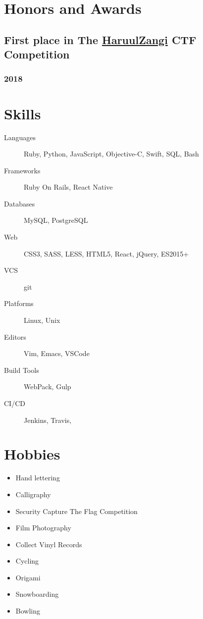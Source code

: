 \documentclass[letterpaper]{article}
\begin{document}
\section{Honors and Awards}
\label{sec:org1446ea2}
\subsection{First place in The \href{http:www.haruulzangi.mn}{HaruulZangi} CTF Competition}
\label{sec:org748aa3c}
\subsubsection{2018}
\label{sec:org92c4b37}
\section{Skills}
\label{sec:org0ad59ad}
\begin{description}
\item[{Languages}] Ruby, Python, JavaScript, Objective-C, Swift, SQL, Bash
\item[{Frameworks}] Ruby On Rails, React Native
\item[{Databases}] MySQL, PostgreSQL
\item[{Web}] CSS3, SASS, LESS, HTML5, React, jQuery, ES2015+
\item[{VCS}] git
\item[{Platforms}] Linux, Unix
\item[{Editors}] Vim, Emacs, VSCode
\item[{Build Tools}] WebPack, Gulp
\item[{CI/CD}] Jenkins, Travis,
\end{description}
\section{Hobbies}
\label{sec:org8107682}
\begin{itemize}
\item Hand lettering
\item Calligraphy
\item Security Capture The Flag Competition
\item Film Photography
\item Collect Vinyl Records
\item Cycling
\item Origami
\item Snowboarding
\item Bowling
\end{itemize}
\end{document}
